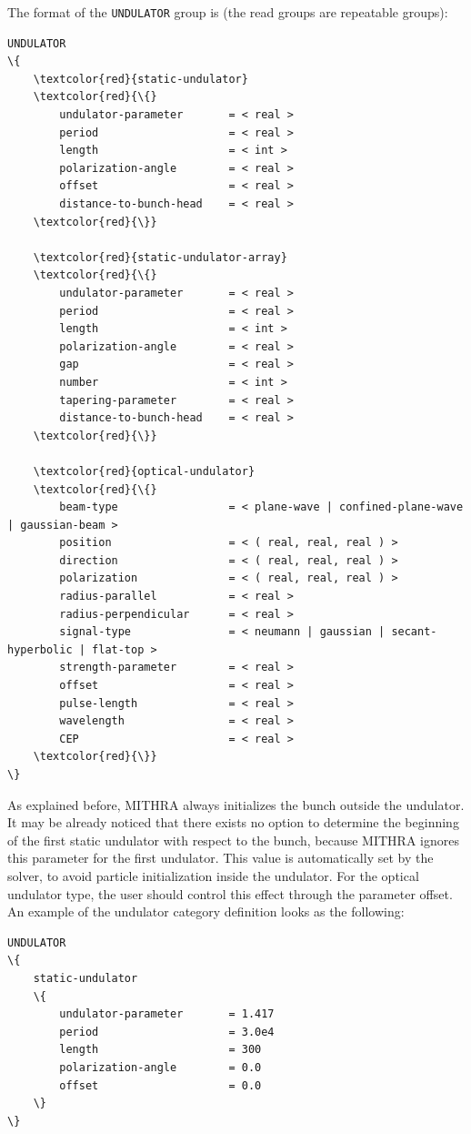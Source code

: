 The format of the \texttt{UNDULATOR} group is (the read groups are repeatable groups):
%
\begin{Verbatim}[frame=single, fontsize=\small, tabsize=4, fontfamily=courier, fontseries=b, commandchars=\\\{\}, obeytabs]
UNDULATOR
\{
	\textcolor{red}{static-undulator}
	\textcolor{red}{\{}
		undulator-parameter		  = < real >
		period					  = < real >
		length					  = < int >
		polarization-angle		  = < real >
		offset					  = < real >
		distance-to-bunch-head 	  = < real >
	\textcolor{red}{\}}

	\textcolor{red}{static-undulator-array}
	\textcolor{red}{\{}
		undulator-parameter		  = < real >
		period					  = < real >
		length					  = < int >
		polarization-angle		  = < real >
		gap						  = < real >
		number					  = < int >
		tapering-parameter		  = < real >
		distance-to-bunch-head    = < real >
	\textcolor{red}{\}}

	\textcolor{red}{optical-undulator}
	\textcolor{red}{\{}
		beam-type				  = < plane-wave | confined-plane-wave | gaussian-beam >
		position				  = < ( real, real, real ) >
		direction				  = < ( real, real, real ) >
		polarization			  = < ( real, real, real ) >
		radius-parallel			  = < real >
		radius-perpendicular	  = < real >
		signal-type				  = < neumann | gaussian | secant-hyperbolic | flat-top >
		strength-parameter		  = < real >
		offset					  = < real >
		pulse-length			  = < real >
		wavelength				  = < real >
		CEP						  = < real >
	\textcolor{red}{\}}
\}
\end{Verbatim}
%
As explained before, MITHRA always initializes the bunch outside the undulator.
%
It may be already noticed that there exists no option to determine the beginning of the first static undulator with respect to the bunch, because MITHRA ignores this parameter for the first undulator.
%
This value is automatically set by the solver, to avoid particle initialization inside the undulator.
%
For the optical undulator type, the user should control this effect through the parameter offset.
%
An example of the undulator category definition looks as the following:
%
\begin{snugshade}
\begin{Verbatim}[fontsize=\small, tabsize=4, fontfamily=courier, fontseries=b, commandchars=\\\{\}, obeytabs]
UNDULATOR
\{
	static-undulator
	\{
		undulator-parameter		  = 1.417
    	period					  = 3.0e4
    	length					  = 300
    	polarization-angle		  = 0.0
    	offset					  = 0.0
    \}
\}
\end{Verbatim}
\end{snugshade}
